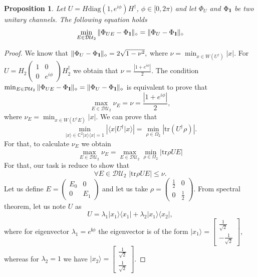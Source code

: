 \documentclass[preprint,12pt, a4paper]{elsarticle}
\newcommand{\ket}[1]{\ensuremath{|#1\rangle}}
\newcommand{\bra}[1]{\ensuremath{\langle#1|}}
\newcommand{\ketbra}[2]{\ensuremath{\ket{#1}\bra{#2}}}
\newcommand{\proj}[1]{\ensuremath{\ketbra{#1}{#1}}}
\newcommand{\1}{{\rm 1\hspace{-0.9mm}l}}
\newcommand{\Id}{{\rm 1\hspace{-0.9mm}l}}
\newcommand{\diaguni}{\ensuremath{\mathcal{DU}}}
\newcommand{\diag}{\mathrm{diag}}
\newcommand{\tr}{\mathrm{tr}}
\newtheorem{proposition}{Proposition}
\begin{document}
\begin{proposition}
 Let $U = H \diag(1, e^{i \phi}) H^\dagger$, $\phi \in [0, 2\pi)$ and	let 
 $\Phi_U$ and $\Phi_\Id$ be two unitary channels. The following equation holds 
	\begin{equation}
	\min_{E \in \diaguni_2} \|\Phi_{UE} - 
	\Phi_\Id\|_\diamond = \|\Phi_{U} - 
	\Phi_\Id\|_\diamond
	\end{equation}
\end{proposition}
\begin{proof} We know that
$
	\| \Phi_U  - \Phi_{\1} \|_\diamond = 2 \sqrt{1-\nu^2},
$
	where $\nu = \min_{x \in W(U^\dagger)} |x|  $. For $U = H_2 \left(\begin{array}{cc}1&0\\0&e^{i \phi}\end{array}\right)  H_2^\dagger$ we obtain that $\nu = \frac{|1 + e^{i \phi} | }{2}$. 
	The condition $ 	\min_{E \in \diaguni_2} \|\Phi_{UE} - 
	\Phi_\Id\|_\diamond = \|\Phi_{U} - 
	\Phi_\Id\|_\diamond $ is equivalent to prove that
	\begin{equation}
	\max_{E \in \diaguni_2 } \nu_E = \nu = \frac{|1 + e^{i \phi} | }{2},
	\end{equation}
	where $\nu_E = \min_{x \in W(U^\dagger E)} |x|. $ We can prove that
	\begin{equation}
	\min_{\ket{x} \in \mathbb{C}^2  \proj{x} = 1} |\bra{x}U^\dagger\ket{x}| = \min_{\rho \in \Omega_2} |\tr(U^\dagger\rho)|. 
	\end{equation}
For that, to calculate $\nu_E$ we obtain \begin{equation}
	\max_{E \in \diaguni_2 } \nu_E  = \max_{E \in \diaguni_2 }  \min_{\rho \in \Omega_2} \left| \tr \rho U E  \right|
\end{equation}
For that, our task is reduce to show that
	\begin{equation}
	\forall E \in \diaguni_2 \,\, | \tr \rho U E | \le \nu. 
	\end{equation}
	Let us define $E = \left(\begin{array}{cc}E_0&0\\0&E_1\end{array}\right)  $ and let us take $\rho = \left(\begin{array}{cc}\frac{1}{2}&0\\0&\frac{1}{2}\end{array}\right) $. 
	From spectral theorem, let us note $U$ as
	\begin{equation}
	U= \lambda_1 \ketbra{x_1}{x_1} + \lambda_2 \ketbra{x_1}{x_2}, 
	\end{equation}
	where  for eigenvector $\lambda_1 = e^{\mathbf{i} \phi}$ the eigenvector is of the form $\ket{x_1} = \left[\begin{array}{c}\frac{1}{\sqrt{2}}\\-\frac{1}{\sqrt{2}}\end{array}\right]$, whereas for  $\lambda_2 = 1$ we have $\ket{x_2} = \left[\begin{array}{c}\frac{1}{\sqrt{2}}\\\frac{1}{\sqrt{2}}\end{array}\right]$.
	

\end{proof}
\end{document}
